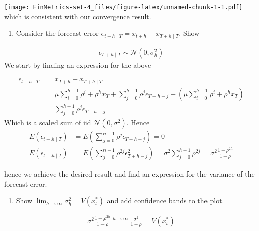 \documentclass[
]{article}
\providecommand{\tightlist}{%
  \setlength{\itemsep}{0pt}\setlength{\parskip}{0pt}}
\begin{document}
\texttt{[image: FinMetrics-set-4\_files/figure-latex/unnamed-chunk-1-1.pdf]}
which is consistent with our convergence result.

\begin{enumerate}
\def\labelenumi{\arabic{enumi}.}
\setcounter{enumi}{2}
\tightlist
\item
  Consider the forecast error
  \(\epsilon_{t+h\mid T} = x_{t+h}-x_{T+h\mid T}\). Show
\end{enumerate}

\[
\begin{align*}
\epsilon_{T+h\mid T} \sim \mathcal{N}(0,\sigma_h^2)
\end{align*}
\] We start by finding an expression for the above

\[
\begin{align*}
\epsilon_{t+h\mid T} &= x_{T+h}- x_{T+h\mid T}\\
&= \mu \sum_{i=0}^{h-1} \rho^i +\rho^h x_T +\sum_{j=0}^{h-1}\rho^j \epsilon_{T+h-j}-\left( \mu \sum_{i=0}^{h-1} \rho^i +\rho^h x_T \right)\\
&=\sum_{j=0}^{h-1} \rho^j \epsilon_{T+h-j}
\end{align*}
\] Which is a scaled sum of iid \(\mathcal{N}(0,\sigma^2)\). Hence \[
\begin{align*}
E(\epsilon_{t+h\mid T})&=E\left( \sum_{j=0}^{n-1} \rho^{j} \epsilon_{T+h-j} \right)=0\\
E(\epsilon_{t+h\mid T})&=E\left( \sum_{j=0}^{n-1} \rho^{2j}\epsilon_{T+h-j}^2 \right)=\sigma^2 \sum_{j=0}^{h-1}\rho^{2j}=\sigma^2 \frac{1-\rho^{2h}}{1-\rho}
\end{align*}
\]

hence we achieve the desired result and find an expression for the
variance of the forecast error.

\begin{enumerate}
\def\labelenumi{\arabic{enumi}.}
\setcounter{enumi}{3}
\tightlist
\item
  Show \(\lim_{h\rightarrow \infty} \sigma_h^2 = V(x_t^*)\) and add
  confidence bands to the plot.
\end{enumerate}

\[
\begin{align*}
\sigma^2 \frac{1-\rho^{2h}}{1-\rho} \overset{h\rightarrow \infty}{=} \frac{\sigma^2}{1-\rho}= V(x_t^*)
\end{align*}
\]
\end{document}
